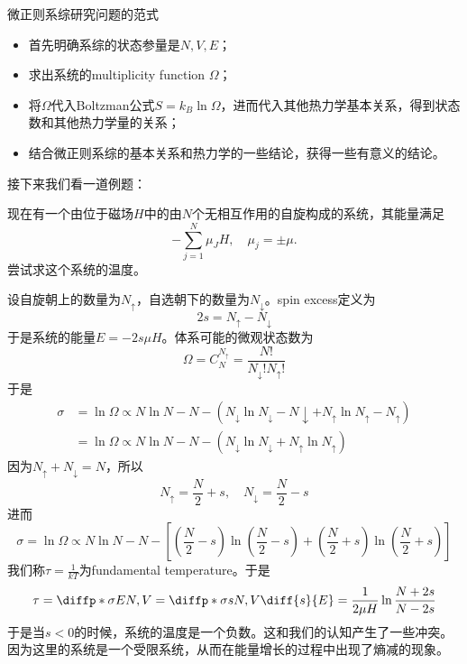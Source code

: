 \begin{pointlist}{微正则系综研究问题的范式}
       \begin{itemize}
              \item 首先明确系综的状态参量是$N,V,E$；
              \item 求出系统的multiplicity function $\Omega$；
              \item 将$\Omega$代入Boltzman公式$S=k_B \ln \Omega$，进而代入其他热力学基本关系，得到状态数和其他热力学量的关系；
              \item 结合微正则系综的基本关系和热力学的一些结论，获得一些有意义的结论。
       \end{itemize}
\end{pointlist}
接下来我们看一道例题：
\begin{example}
       现在有一个由位于磁场$H$中的由$N$个无相互作用的自旋构成的系统，其能量满足\begin{equation}
              -\sum_{j=1}^N\mu_J H,\quad \mu_j =\pm \mu.
       \end{equation}
       尝试求这个系统的温度。
\end{example}
\begin{solution}
       设自旋朝上的数量为$N_\uparrow$，自选朝下的数量为$N_\downarrow$。spin excess定义为\begin{equation}
              2s=N_\uparrow-N_\downarrow
       \end{equation}
       于是系统的能量$E=-2s \mu H$。体系可能的微观状态数为\begin{equation}
              \Omega =C_{N}^{N_\uparrow}=\frac{N!}{N_\downarrow !N_\uparrow!}
       \end{equation}
       于是\begin{equation}
              \begin{aligned}
              \sigma&=\ln\Omega\propto N\ln N -N -(N_\downarrow \ln N_\downarrow -N\downarrow + N_\uparrow \ln N_\uparrow -N_\uparrow)\\
              &=\ln\Omega\propto N\ln N -N -(N_\downarrow \ln N_\downarrow + N_\uparrow \ln N_\uparrow)
              \end{aligned}
       \end{equation}
       因为$N_\uparrow+N_\downarrow=N$，所以\begin{equation}
              N_\uparrow=\frac{N}{2}+s,\quad N_{\downarrow}=\frac{N}{2}-s
       \end{equation}
       进而\begin{equation}
              \sigma=\ln\Omega\propto N\ln N -N -[(\frac{N}{2}-s) \ln (\frac{N}{2}-s) +(\frac{N}{2}+s) \ln(\frac{N}{2}+s)]
       \end{equation}
       我们称$\displaystyle \tau=\frac{1}{kT}$为fundamental temperature。于是\begin{equation}
              \tau=\diffp*{\sigma}{E}{N,V} = \diffp*{\sigma}{s}{N,V}\diff{s}{E}=\frac{1}{2\mu H}\ln \frac{N+2s}{N-2s}
       \end{equation}
	   于是当$s<0$的时候，系统的温度是一个负数。这和我们的认知产生了一些冲突。因为这里的系统是一个受限系统，从而在能量增长的过程中出现了熵减的现象。
\end{solution}

